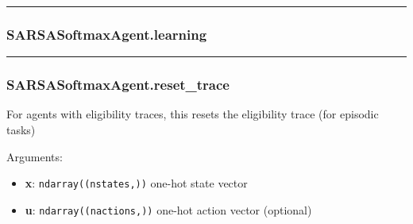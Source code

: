 \begin{Shaded}
\begin{Highlighting}[]
\end{Highlighting}
\end{Shaded}

\begin{center}\rule{0.5\linewidth}{\linethickness}\end{center}

\hypertarget{sarsasoftmaxagent.learning}{%
\subsubsection{SARSASoftmaxAgent.learning}\label{sarsasoftmaxagent.learning}}

\begin{Shaded}
\begin{Highlighting}[]
\end{Highlighting}
\end{Shaded}

\begin{center}\rule{0.5\linewidth}{\linethickness}\end{center}

\hypertarget{sarsasoftmaxagent.reset_trace}{%
\subsubsection{SARSASoftmaxAgent.reset\_trace}\label{sarsasoftmaxagent.reset_trace}}

\begin{Shaded}
\begin{Highlighting}[]
\OperatorTok{=}\NormalTok{)}
\end{Highlighting}
\end{Shaded}

For agents with eligibility traces, this resets the eligibility trace
(for episodic tasks)

Arguments:

\begin{itemize}
\tightlist
\item
  \textbf{x}: \texttt{ndarray((nstates,))} one-hot state vector
\item
  \textbf{u}: \texttt{ndarray((nactions,))} one-hot action vector
  (optional)
\end{itemize}

